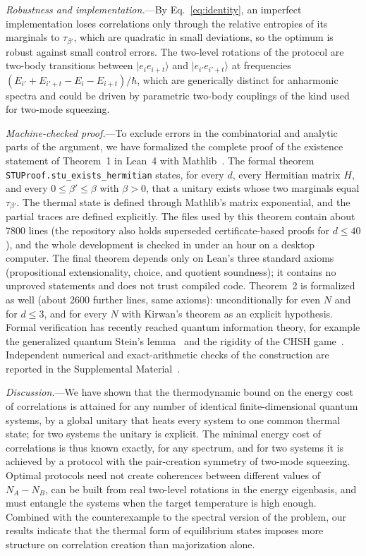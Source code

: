\documentclass[aps,prl,reprint,superscriptaddress,amsmath,amssymb]{revtex4-2}
\newcommand{\lean}[1]{\texttt{#1}}
\begin{document}
\textit{Robustness and implementation.}---By Eq.~\eqref{eq:identity}, an imperfect implementation loses correlations
only through the relative entropies of its marginals to $\tau_{\beta'}$, which are quadratic in small deviations, so
the optimum is robust against small control errors. The two-level rotations of the protocol are two-body transitions
between $|e_ie_{i+t}\rangle$ and $|e_{i'}e_{i'+t}\rangle$ at frequencies $(E_{i'}+E_{i'+t}-E_i-E_{i+t})/\hbar$, which
are generically distinct for anharmonic spectra and could be driven by parametric two-body couplings of the kind used
for two-mode squeezing.

\textit{Machine-checked proof.}---To exclude errors in the combinatorial and analytic parts of the argument, we have
formalized the complete proof of the existence statement of Theorem~1 in Lean~4 with
Mathlib~\cite{Lean2021,Mathlib2020,repo}. The
formal theorem \lean{STUProof.stu\_exists\_hermitian} states, for every $d$, every Hermitian matrix $H$, and every
$0\le\beta'\le\beta$ with $\beta>0$, that a unitary exists whose two marginals equal $\tau_{\beta'}$. The thermal state
is defined through Mathlib's matrix exponential, and the partial traces are defined explicitly. The files used by
this theorem contain about 7800 lines (the repository also holds superseded certificate-based proofs for $d\le40$),
and the whole development is checked in under an hour on a desktop computer. The final theorem depends only on Lean's
three standard axioms (propositional extensionality, choice, and quotient soundness); it contains no unproved
statements and does not trust compiled code. Theorem~2 is formalized as well (about 2600 further lines, same axioms):
unconditionally for even $N$ and for $d\le3$, and for every $N$ with Kirwan's theorem as an explicit hypothesis. Formal verification has recently reached quantum information theory,
for example the generalized quantum Stein's lemma~\cite{Meiburg2025} and the rigidity of the CHSH
game~\cite{ZhaoYu2026}. Independent numerical and exact-arithmetic checks of the construction are reported in the
Supplemental Material~\cite{SM}.

\textit{Discussion.}---We have shown that the thermodynamic bound on the energy cost of correlations is attained for
any number of identical finite-dimensional quantum systems, by a global unitary that heats every system to one common
thermal state; for two systems the unitary is explicit. The minimal energy cost of correlations is thus known exactly,
for any spectrum, and for two systems it is achieved by a protocol with the pair-creation symmetry of two-mode
squeezing. Optimal protocols need not create
coherences between different values of $N_A-N_B$, can be built from real two-level rotations in the energy
eigenbasis, and must entangle the systems when the target temperature is high enough. Combined with the
counterexample to the spectral version of the problem, our results indicate that the thermal form of equilibrium
states imposes more structure on correlation creation than majorization alone.
\end{document}
